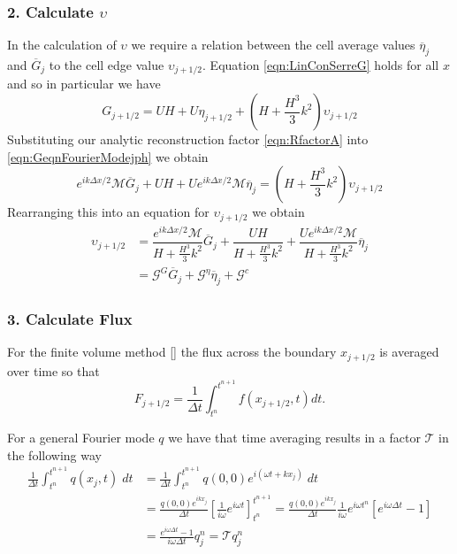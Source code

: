 \subsubsection{2. Calculate $\upsilon$} 
In the calculation of $\upsilon$ we require a relation between the cell average values $\overline{\eta}_j$ and $\overline{G}_j$ to the cell edge value $\upsilon_{j+1/2}$. Equation \eqref{eqn:LinConSerreG} holds for all $x$ and so in particular we have 
\begin{equation}
G_{j+1/2} = UH + U \eta_{j+1/2} + \left(H  + \frac{H^3}{3}k^2\right)\upsilon_{j+1/2}
\label{eqn:GeqnFourierModejph}
\end{equation}
Substituting our analytic reconstruction factor \eqref{eqn:RfactorA} into \eqref{eqn:GeqnFourierModejph} we obtain
\begin{equation}
e^{i {k\Delta x}/{2}}\mathcal{M}\overline{G}_j +  UH + U e^{i {k\Delta x}/{2}}\mathcal{M}\overline{\eta}_j = \left(H  + \frac{H^3}{3}k^2\right)\upsilon_{j+1/2}
\end{equation}
Rearranging this into an equation for $\upsilon_{j+1/2}$ we obtain
\begin{align}
\upsilon_{j+1/2} &=\dfrac{ e^{i {k\Delta x}/{2}}\mathcal{M}}{H  + \frac{H^3}{3}k^2} \overline{G}_j +  \dfrac{UH}{H  + \frac{H^3}{3}k^2} +  \dfrac{U e^{i {k\Delta x}/{2}}\mathcal{M}}{H  + \frac{H^3}{3}k^2}\overline{\eta}_j  \nonumber \\
& = \mathcal{G}^G \overline{G}_j + \mathcal{G}^\eta \overline{\eta}_j + \mathcal{G}^c
\label{eqn:GfactorA}
\end{align}

\subsubsection{3. Calculate Flux} 
For the finite volume method [] the flux across the boundary $x_{j+1/2}$ is averaged over time so that
\begin{equation}
F_{j+1/2} = \frac{1}{\Delta t} \int_{t^n}^{t^{n+1}}f(x_{j+1/2},t) dt .
\label{eqn:AvgFluxDef}
\end{equation}

For a general Fourier mode $q$ we have that time averaging results in a factor $\mathcal{T}$ in the following way
\begin{align}
\frac{1}{\Delta t} \int_{t^n}^{t^{n+1}} q(x_j,t)\; dt &= \frac{1}{\Delta t} \int_{t^n}^{t^{n+1}} q(0,0) e^{i\left(\omega t + kx_j\right)} \; dt \nonumber\\ &= \frac{q(0,0)e^{i k  x_j}}{\Delta t} \left[\frac{1}{i\omega} e^{i\omega t}\right]_{t^n}^{t^{n+1}} \nonumber = \frac{q(0,0)e^{i k  x_j}}{\Delta t}  \frac{1}{i\omega} e^{i\omega t^n} \left[e^{i\omega \Delta t} -1\right] \nonumber\\ &= \frac{e^{i\omega \Delta t} -1}{i\omega\Delta t} q^n_j = \mathcal{T}q^n_j
\end{align}

